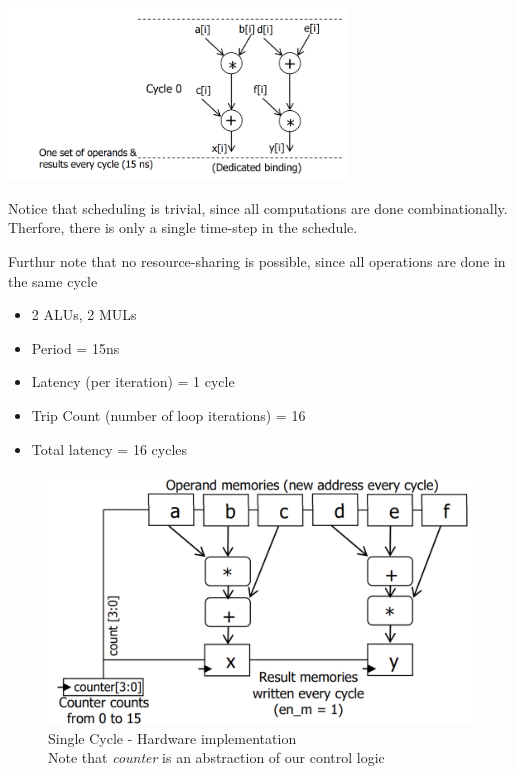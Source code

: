 \documentclass{article}
\begin{document}
\begin{minipage}[t]{0.5\textwidth}
    \vspace{0pt}
    \includegraphics[width=9cm, scale=1]{S1/singleCycle_scheduling.PNG}
\end{minipage}%
\begin{minipage}[t]{0.5\textwidth}
    \vspace{0pt}
    Notice that scheduling is trivial, since all computations are done combinationally.
    Therfore, there is only a single time-step in the schedule. \newline

    Furthur note that no resource-sharing is possible, since all operations are done in the same cycle \newline

    \begin{itemize}
        \item 2 ALUs, 2 MULs
        \item Period = 15ns
        \item Latency (per iteration) = 1 cycle
        \item Trip Count (number of loop iterations) = 16
        \item Total latency = 16 cycles
    \end{itemize}
\end{minipage}

\begin{figure}[htp]
    \centering
    \includegraphics[width=12cm, scale=1]{S1/singleCycle_hardware.PNG}
    \caption{Single Cycle - Hardware implementation\\
            Note that \textit{counter} is an abstraction of our control logic}
\end{figure}
\end{document}
